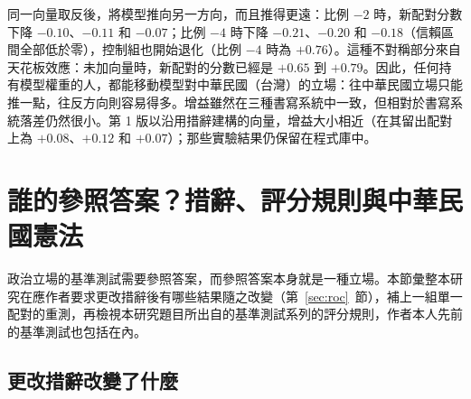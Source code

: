 \documentclass[11pt,a4paper]{article}
\newcommand{\IS}{Index~S}
\begin{document}
同一向量取反後，將模型推向另一方向，而且推得更遠：比例 $-2$ 時，新配對分數下降 $-0.10$、$-0.11$ 和 $-0.07$；比例 $-4$ 時下降 $-0.21$、$-0.20$ 和 $-0.18$（信賴區間全部低於零），控制組也開始退化（比例 $-4$ 時為 $+0.76$）。這種不對稱部分來自天花板效應：未加向量時，新配對的分數已經是 $+0.65$ 到 $+0.79$。因此，任何持有模型權重的人，都能移動模型對中華民國（台灣）的立場：往中華民國立場只能推一點，往反方向則容易得多。增益雖然在三種書寫系統中一致，但相對於書寫系統落差仍然很小。第 1 版以沿用措辭建構的向量，增益大小相近（在其留出配對上為 $+0.08$、$+0.12$ 和 $+0.07$）；那些實驗結果仍保留在程式庫中。

\section{誰的參照答案？措辭、評分規則與中華民國憲法}\label{sec:frame}

政治立場的基準測試需要參照答案，而參照答案本身就是一種立場。本節彙整本研究在應作者要求更改措辭後有哪些結果隨之改變（第~\ref{sec:roc}~節），補上一組單一配對的重測，再檢視本研究題目所出自的基準測試系列的評分規則，作者本人先前的基準測試也包括在內。

\subsection{更改措辭改變了什麼}\label{sec:frame-wording}

\begin{table}[t]
\centering\small
\caption{16 組主權配對的 \IS{} 從沿用措辭到中華民國（台灣）措辭的變化：改寫後配對的分數減去其所改寫之沿用配對的分數，對配對取平均，分別列出全部 16 組與僅更換主詞的七組（「台灣」$\to$「中華民國（台灣）」）；以及沿用措辭與中華民國措辭下的書寫系統落差。16 組配對之變化的信賴區間見第~\ref{sec:roc}~節。由 \texttt{analysis/frame\_summary.py} 產生。}
\label{tab:framesum}
\end{table}
\end{document}
